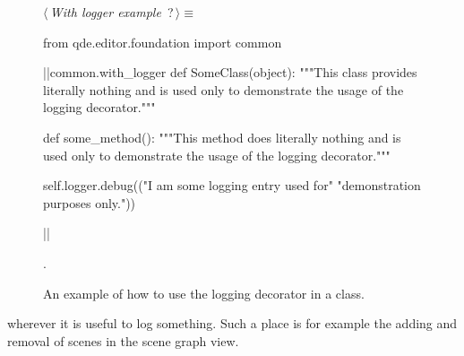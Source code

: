 \documentclass[%
    a4paper,    %
    justified,  %
    nobib,      %
    openany     %
]{tufte-book}
\makeatletter
\renewcommand{\label}[1]{\@tufte@label{##1}}%
\makeatother
\begin{document}
\begin{figure}
\begin{flushleft} \small
\begin{minipage}{\linewidth}\label{scrap59}\raggedright\small
{} $\langle\,${\itshape With logger example}\nobreak\ {\footnotesize {?}}$\,\rangle\equiv$
\vspace{-1ex}
\begin{pythoncode}
from qde.editor.foundation import common

|\normalfont{}\fontfamily{}|common.with_logger
def SomeClass(object):
    """This class provides literally nothing and is used only to demonstrate the
    usage of the logging decorator."""

    def some_method():
        """This method does literally nothing and is used only to demonstrate the
        usage of the logging decorator."""

        self.logger.debug(("I am some logging entry used for"
                           "demonstration purposes only."))

|\NWsep|
\end{pythoncode}
\vspace{1.5ex}
\footnotesize
\begin{list}{}{\setlength{\itemsep}{-\parsep}\setlength{\itemindent}{-\leftmargin}}
\item {\NWtxtMacroNoRef}.

\item{}
\end{list}
\end{minipage}\vspace{4ex}
\end{flushleft}
\caption{An example of how to use the logging decorator in a class.}
\label{logging:lst:logging-example}
\end{figure}

 wherever it is useful to log
something. Such a place is for example the adding and removal of scenes in the
scene graph view.
\end{document}
